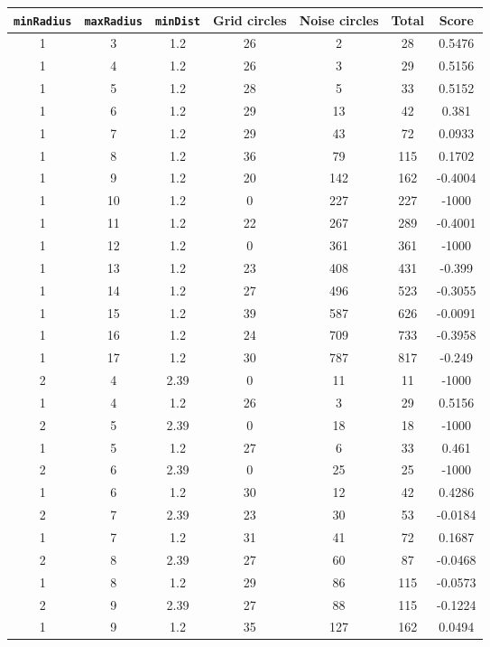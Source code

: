 \documentclass[letterpaper, 12pt]{article}
\begin{document}
\begin{longtable}{|c|c|c|c|c|c|c|}
\hline
\textbf{\texttt{minRadius}} & \textbf{\texttt{maxRadius}} & \textbf{\texttt{minDist}} & \textbf{Grid circles} & \textbf{Noise circles} & \textbf{Total} & \textbf{Score} \\
\hline
1 & 3 & 1.2 & 26 & 2 & 28 & 0.5476 \\
\hline
1 & 4 & 1.2 & 26 & 3 & 29 & 0.5156 \\
\hline
1 & 5 & 1.2 & 28 & 5 & 33 & 0.5152 \\
\hline
1 & 6 & 1.2 & 29 & 13 & 42 & 0.381 \\
\hline
1 & 7 & 1.2 & 29 & 43 & 72 & 0.0933 \\
\hline
1 & 8 & 1.2 & 36 & 79 & 115 & 0.1702 \\
\hline
1 & 9 & 1.2 & 20 & 142 & 162 & -0.4004 \\
\hline
1 & 10 & 1.2 & 0 & 227 & 227 & -1000 \\
\hline
1 & 11 & 1.2 & 22 & 267 & 289 & -0.4001 \\
\hline
1 & 12 & 1.2 & 0 & 361 & 361 & -1000 \\
\hline
1 & 13 & 1.2 & 23 & 408 & 431 & -0.399 \\
\hline
1 & 14 & 1.2 & 27 & 496 & 523 & -0.3055 \\
\hline
1 & 15 & 1.2 & 39 & 587 & 626 & -0.0091 \\
\hline
1 & 16 & 1.2 & 24 & 709 & 733 & -0.3958 \\
\hline
1 & 17 & 1.2 & 30 & 787 & 817 & -0.249 \\
\hline
2 & 4 & 2.39 & 0 & 11 & 11 & -1000 \\
\hline
1 & 4 & 1.2 & 26 & 3 & 29 & 0.5156 \\
\hline
2 & 5 & 2.39 & 0 & 18 & 18 & -1000 \\
\hline
1 & 5 & 1.2 & 27 & 6 & 33 & 0.461 \\
\hline
2 & 6 & 2.39 & 0 & 25 & 25 & -1000 \\
\hline
1 & 6 & 1.2 & 30 & 12 & 42 & 0.4286 \\
\hline
2 & 7 & 2.39 & 23 & 30 & 53 & -0.0184 \\
\hline
1 & 7 & 1.2 & 31 & 41 & 72 & 0.1687 \\
\hline
2 & 8 & 2.39 & 27 & 60 & 87 & -0.0468 \\
\hline
1 & 8 & 1.2 & 29 & 86 & 115 & -0.0573 \\
\hline
2 & 9 & 2.39 & 27 & 88 & 115 & -0.1224 \\
\hline
1 & 9 & 1.2 & 35 & 127 & 162 & 0.0494 \\

\end{longtable}
\end{document}
